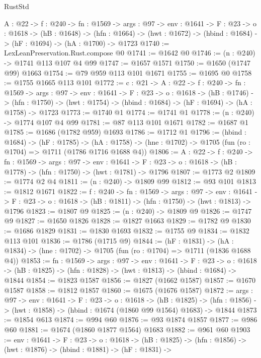 \begin{lexlean}{RustStd}
\begin{coremodule}
  {A : @22} ->
  {f : @240} ->
  {fn : @1569} ->
  {args : @97} ->
  {env : @1641} ->
  {F : @23} ->
  {o : @1618} ->
  (hB : @1648) ->
  (hfn : @1664) -> (hwt : @1672) -> (hbind : @1684) -> (hF : @1694) -> (hA : @1700) -> @1723
@1740 := LexLeanPreservation.Rust.compose @0
@1741 := @1642 @0
@1746 := (n : @240) -> @1741 @113 @107 @4 @99
@1747 := @1657 @1571
@1750 := @1650 (@1747 @99) @1663
@1754 := @79 @959 @113 @101 @1671
@1755 := @1695 @0
@1758 := @1755 @1665 @113 @101
@1772 := {c : @21} ->
  {A : @22} ->
  {f : @240} ->
  {fn : @1569} ->
  {args : @97} ->
  {env : @1641} ->
  {F : @23} ->
  {o : @1618} ->
  (hB : @1746) ->
  (hfn : @1750) -> (hwt : @1754) -> (hbind : @1684) -> (hF : @1694) -> (hA : @1758) -> @1723
@1773 := @1740 @1
@1774 := @1741 @1
@1778 := (n : @240) -> @1774 @107 @4 @99
@1781 := @87 @113 @101 @1671
@1782 := @1687 @1
@1785 := @1686 (@1782 @959) @1693
@1786 := @1712 @1
@1796 := (hbind : @1684) ->
  (hF : @1785) ->
  (hA : @1758) -> (hne : @1702) -> @1705 (fun (ro : @1704) => @1711 (@1786 @1716 @1688 @4))
@1806 := {A : @22} ->
  {f : @240} ->
  {fn : @1569} ->
  {args : @97} ->
  {env : @1641} ->
  {F : @23} -> {o : @1618} -> (hB : @1778) -> (hfn : @1750) -> (hwt : @1781) -> @1796
@1807 := @1773 @2
@1809 := @1774 @2 @4
@1811 := (n : @240) -> @1809 @99
@1812 := @93 @101
@1813 := @1812 @1671
@1822 := {f : @240} ->
  {fn : @1569} ->
  {args : @97} ->
  {env : @1641} ->
  {F : @23} -> {o : @1618} -> (hB : @1811) -> (hfn : @1750) -> (hwt : @1813) -> @1796
@1823 := @1807 @9
@1825 := (n : @240) -> @1809 @9
@1826 := @1747 @9
@1827 := @1650 @1826
@1828 := @1827 @1663
@1829 := @1782 @9
@1830 := @1686 @1829
@1831 := @1830 @1693
@1832 := @1755 @9
@1834 := @1832 @113 @101
@1836 := @1786 (@1715 @9)
@1844 := (hF : @1831) ->
  (hA : @1834) -> (hne : @1702) -> @1705 (fun (ro : @1704) => @1711 (@1836 @1688 @4))
@1853 := {fn : @1569} ->
  {args : @97} ->
  {env : @1641} ->
  {F : @23} ->
  {o : @1618} -> (hB : @1825) -> (hfn : @1828) -> (hwt : @1813) -> (hbind : @1684) -> @1844
@1854 := @1823 @1587
@1856 := @1827 (@1662 @1587)
@1857 := @1670 @1587
@1858 := @1812 @1857
@1860 := @1675 (@1676 @1587)
@1872 := {args : @97} ->
  {env : @1641} ->
  {F : @23} ->
  {o : @1618} ->
  (hB : @1825) -> (hfn : @1856) -> (hwt : @1858) -> (hbind : @1674 (@1860 @99 @1564) @1683) -> @1844
@1873 := @1854 @613
@1874 := @994 @60
@1876 := @93 @1874 @1857
@1877 := @986 @60
@1881 := @1674 (@1860 @1877 @1564) @1683
@1882 := @961 @60
@1903 := {env : @1641} ->
  {F : @23} ->
  {o : @1618} ->
  (hB : @1825) ->
  (hfn : @1856) ->
  (hwt : @1876) ->
  (hbind : @1881) ->
  (hF : @1831) ->

\end{coremodule}
\end{lexlean}
